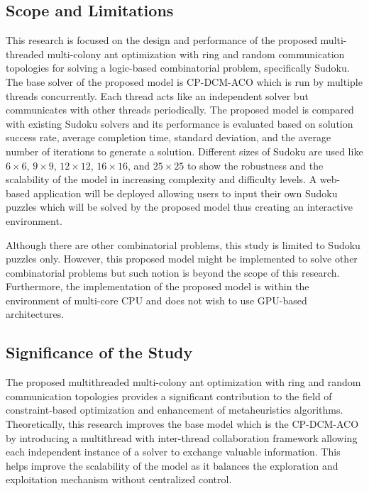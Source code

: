        \subsection{Scope and Limitations}
            This research is focused on the design and performance of the proposed multi-threaded multi-colony ant optimization with ring and random communication topologies for solving a logic-based combinatorial problem, specifically Sudoku. The base solver of the proposed model is CP-DCM-ACO which is run by multiple threads concurrently. Each thread acts like an independent solver but communicates with other threads periodically. The proposed model is compared with existing Sudoku solvers and its performance is evaluated based on solution success rate, average completion time, standard deviation, and the average number of iterations to generate a solution. Different sizes of Sudoku are used like $6 \times 6$, $9 \times 9$, $12 \times 12$, $16 \times 16$, and $25 \times 25$ to show the robustness and the scalability of the model in increasing complexity and difficulty levels. A web-based application will be deployed allowing users to input their own Sudoku puzzles which will be solved by the proposed model thus creating an interactive environment. 
    
            Although there are other combinatorial problems, this study is limited to Sudoku puzzles only. However, this proposed model might be implemented to solve other combinatorial problems but such notion is beyond the scope of this research. Furthermore, the implementation of the proposed model is within the environment of multi-core CPU and does not wish to use GPU-based architectures. 


        \subsection{Significance of the Study}
            The proposed multithreaded multi-colony ant optimization with ring and random communication topologies provides a significant contribution to the field of constraint-based optimization and enhancement of metaheuristics algorithms. Theoretically, this research improves the base model which is the CP-DCM-ACO by introducing a multithread with inter-thread collaboration framework allowing each independent instance of a solver to exchange valuable information. This helps improve the scalability of the model as it balances the exploration and exploitation mechanism without centralized control. 


